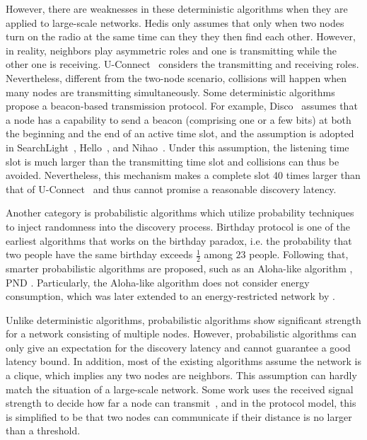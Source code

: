 However, there are weaknesses in these deterministic algorithms when they are applied to large-scale networks.
Hedis \cite{chen2015heterogeneous} only assumes that only when two nodes
turn on the radio at the same time can they they then find each other.
However, in reality, neighbors play asymmetric roles and one is
transmitting while the other one is receiving.
U-Connect~\cite{kandhalu2010u} considers the transmitting and receiving roles.
Nevertheless, different from the two-node scenario, collisions will happen when many nodes are transmitting simultaneously. 
Some deterministic algorithms propose a beacon-based transmission protocol.
For example, Disco~\cite{dutta2008practical} assumes that a node has a
capability to send a beacon (comprising one or a few bits) at both the beginning
and the end of an active time slot, and the assumption is adopted in 
SearchLight~\cite{bakht2012searchlight}, Hello~\cite{sun2014hello}, and
Nihao~\cite{qiu2016talk}.
Under this assumption, the listening time slot is much larger than the
transmitting time slot and collisions can thus be avoided.
Nevertheless, this mechanism makes a complete slot 
40 times larger than that of U-Connect~\cite{kandhalu2010u} and thus cannot
promise a reasonable discovery latency.

Another category is probabilistic algorithms \cite{mcglynn2001birthday,
vasudevan2009neighbor,you2011aloha,song2014probabilistic} which utilize
probability techniques to inject randomness into the discovery process. 
Birthday protocol \cite{mcglynn2001birthday} is one of the earliest algorithms that works on the birthday
paradox, i.e. the probability that two people have the same
birthday exceeds $\frac{1}{2}$ among $23$ people. Following that,
smarter probabilistic algorithms are proposed, such as an Aloha-like
algorithm \cite{vasudevan2009neighbor, you2011aloha}, PND
\cite{song2014probabilistic}. Particularly, the Aloha-like algorithm
\cite{vasudevan2009neighbor} does not consider energy consumption,
which was later extended to an energy-restricted network by
\cite{you2011aloha}.

Unlike deterministic algorithms,
probabilistic algorithms show significant strength for a network consisting of multiple nodes.
However, probabilistic algorithms can only give an expectation for the
discovery latency and cannot guarantee a good latency bound.
In addition, most of the existing algorithms assume the network is a clique, which implies any two nodes are neighbors. 
This assumption can hardly match the situation of a large-scale network.
Some work uses the received signal strength to decide how far a node
can transmit~\cite{daiya2011experimental}, and in the protocol model,
this is simplified to be that two nodes can communicate if their distance is no
larger than a threshold.


